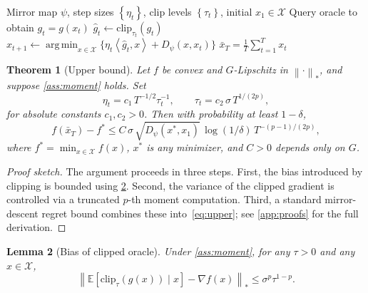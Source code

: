 \documentclass[11pt,a4paper]{article}
\theoremstyle{plain}
\newtheorem{theorem}{Theorem}[section]
\newtheorem{lemma}[theorem]{Lemma}
\theoremstyle{definition}
\theoremstyle{remark}
\DeclareMathOperator*{\argmin}{arg\,min}
\newcommand{\E}{\mathbb{E}}
\newcommand{\norm}[1]{\left\lVert#1\right\rVert}
\newcommand{\inner}[2]{\left\langle#1,#2\right\rangle}
\newcommand{\set}[1]{\left\{#1\right\}}
\begin{document}
\begin{algorithm}[t]
\caption{Clipped Mirror Descent (CMD)}
\label{alg:cmd}
\begin{algorithmic}[1]
\Require Mirror map $\psi$, step sizes $\set{\eta_t}$, clip levels
         $\set{\tau_t}$, initial $x_1 \in \mathcal{X}$
    \State Query oracle to obtain $g_t = g(x_t)$
    \State $\hat{g}_t \gets \mathrm{clip}_{\tau_t}(g_t)$
    \State $x_{t+1} \gets \displaystyle\argmin_{x \in \mathcal{X}}
           \bigl\{ \eta_t \inner{\hat{g}_t}{x} + D_\psi(x, x_t) \bigr\}$
\EndFor
\State \Return $\bar{x}_T = \tfrac{1}{T} \sum_{t=1}^{T} x_t$
\end{algorithmic}
\end{algorithm}

\begin{theorem}[Upper bound]
\label{thm:upper}
Let $f$ be convex and $G$-Lipschitz in $\norm{\cdot}_*$, and suppose
\cref{ass:moment} holds. Set
\begin{equation*}
    \eta_t = c_1 \, T^{-1/2} \tau_t^{-1}, \qquad
    \tau_t = c_2 \, \sigma \, T^{1/(2p)},
\end{equation*}
for absolute constants $c_1, c_2 > 0$. Then with probability at least
$1 - \delta$,
\begin{equation}
\label{eq:upper}
    f(\bar{x}_T) - f^*
    \leq C \, \sigma \, \sqrt{D_\psi(x^*, x_1)} \, \log(1/\delta) \,
    T^{-(p-1)/(2p)},
\end{equation}
where $f^* = \min_{x \in \mathcal{X}} f(x)$, $x^*$ is any minimizer, and
$C > 0$ depends only on $G$.
\end{theorem}

\begin{proof}[Proof sketch]
The argument proceeds in three steps. First, the bias introduced by clipping
is bounded using \cref{lem:bias}. Second, the variance of the clipped
gradient is controlled via a truncated $p$-th moment computation. Third, a
standard mirror-descent regret bound combines these into~\eqref{eq:upper};
see \cref{app:proofs} for the full derivation.
\end{proof}

\begin{lemma}[Bias of clipped oracle]
\label{lem:bias}
Under \cref{ass:moment}, for any $\tau > 0$ and any $x \in \mathcal{X}$,
\begin{equation*}
    \norm{\E[\mathrm{clip}_\tau(g(x)) \mid x] - \nabla f(x)}_*
    \leq \sigma^p \tau^{1-p}.
\end{equation*}
\end{lemma}
\end{document}
